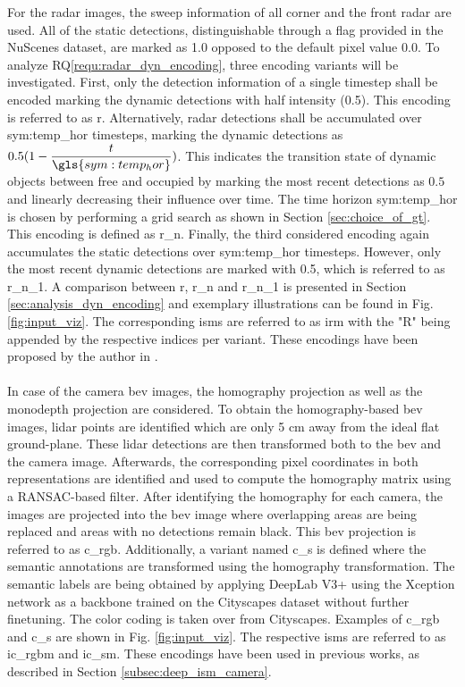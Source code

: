 For the radar images, the sweep information of all corner and the front radar are used. All of the static detections, distinguishable through a flag provided in the NuScenes dataset, are marked as 1.0 opposed to the default pixel value $0.0$. To analyze RQ\ref{requ:radar_dyn_encoding}, three encoding variants will be investigated. First, only the detection information of a single timestep shall be encoded marking the dynamic detections with half intensity (0.5). This encoding is referred to as \gls{r}. Alternatively, radar detections shall be accumulated over \gls{sym:temp_hor} timesteps, marking the dynamic detections as $0.5(1-\dfrac{t}{\gls{sym:temp_hor}})$. This indicates the transition state of dynamic objects between free and occupied by marking the most recent detections as $0.5$ and linearly decreasing their influence over time. The time horizon \gls{sym:temp_hor} is chosen by performing a grid search as shown in Section \ref{sec:choice_of_gt}. This encoding is defined as \gls{r_n}. Finally, the third considered encoding again accumulates the static detections over \gls{sym:temp_hor} timesteps. However, only the most recent dynamic detections are marked with 0.5, which is referred to as \gls{r_n_1}. A comparison between \gls{r}, \gls{r_n} and \gls{r_n_1} is presented in Section \ref{sec:analysis_dyn_encoding} and exemplary illustrations can be found in Fig. \ref{fig:input_viz}. The corresponding \gls{ism}s are referred to as \gls{irm} with the "R" being appended by the respective indices per variant. These encodings have been proposed by the author in \cite{bauer2019deepame,bauer2019deepiv}.
\\\\
In case of the camera \gls{bev} images, the homography projection as well as the \gls{monodepth} projection are considered. To obtain the homography-based \gls{bev} images, lidar points are identified which are only 5 cm away from the ideal flat ground-plane. These lidar detections are then transformed both to the \gls{bev} and the camera image. Afterwards, the corresponding pixel coordinates in both representations are identified and used to compute the homography matrix using a RANSAC-based filter. After identifying the homography for each camera, the images are projected into the \gls{bev} image where overlapping areas are being replaced and areas with no detections remain black. This \gls{bev} projection is referred to as \gls{c_rgb}. Additionally, a variant named \gls{c_s} is defined where the semantic annotations are transformed using the homography transformation. The semantic labels are being obtained by applying DeepLab V3+ \cite{deeplabv3plus2018} using the Xception network \cite{chollet2017xception} as a backbone trained on the Cityscapes dataset \cite{cordts2016cityscapes} without further finetuning. The color coding is taken over from Cityscapes. Examples of \gls{c_rgb} and \gls{c_s} are shown in Fig. \ref{fig:input_viz}. The respective \gls{ism}s are referred to as \gls{ic_rgbm} and \gls{ic_sm}. These encodings have been used in previous works, as described in Section \ref{subsec:deep_ism_camera}.
